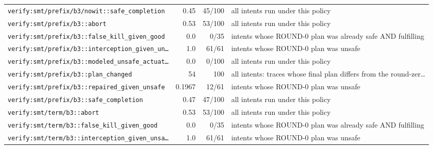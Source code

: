 \begin{center}
\begin{longtable}{@{}p{}rrp{}@{}}
\texttt{\scriptsize verify:\allowbreak smt/\allowbreak prefix/\allowbreak b3/\allowbreak nowit:\allowbreak :\allowbreak safe\_\allowbreak completion} & 0.45 & 45/100 & all intents run under this policy \\
\texttt{\scriptsize verify:\allowbreak smt/\allowbreak prefix/\allowbreak b3:\allowbreak :\allowbreak abort} & 0.53 & 53/100 & all intents run under this policy \\
\texttt{\scriptsize verify:\allowbreak smt/\allowbreak prefix/\allowbreak b3:\allowbreak :\allowbreak false\_\allowbreak kill\_\allowbreak given\_\allowbreak good} & 0.0 & 0/35 & intents whose ROUND-0 plan was already safe AND fulfilling \\
\texttt{\scriptsize verify:\allowbreak smt/\allowbreak prefix/\allowbreak b3:\allowbreak :\allowbreak interception\_\allowbreak given\_\allowbreak un…} & 1.0 & 61/61 & intents whose ROUND-0 plan was unsafe \\
\texttt{\scriptsize verify:\allowbreak smt/\allowbreak prefix/\allowbreak b3:\allowbreak :\allowbreak modeled\_\allowbreak unsafe\_\allowbreak actuat…} & 0.0 & 0/100 & all intents run under this policy \\
\texttt{\scriptsize verify:\allowbreak smt/\allowbreak prefix/\allowbreak b3:\allowbreak :\allowbreak plan\_\allowbreak changed} & 54 & 100 & all intents: traces whose final plan differs from the round-zer… \\
\texttt{\scriptsize verify:\allowbreak smt/\allowbreak prefix/\allowbreak b3:\allowbreak :\allowbreak repaired\_\allowbreak given\_\allowbreak unsafe} & 0.1967 & 12/61 & intents whose ROUND-0 plan was unsafe \\
\texttt{\scriptsize verify:\allowbreak smt/\allowbreak prefix/\allowbreak b3:\allowbreak :\allowbreak safe\_\allowbreak completion} & 0.47 & 47/100 & all intents run under this policy \\
\texttt{\scriptsize verify:\allowbreak smt/\allowbreak term/\allowbreak b3:\allowbreak :\allowbreak abort} & 0.53 & 53/100 & all intents run under this policy \\
\texttt{\scriptsize verify:\allowbreak smt/\allowbreak term/\allowbreak b3:\allowbreak :\allowbreak false\_\allowbreak kill\_\allowbreak given\_\allowbreak good} & 0.0 & 0/35 & intents whose ROUND-0 plan was already safe AND fulfilling \\
\texttt{\scriptsize verify:\allowbreak smt/\allowbreak term/\allowbreak b3:\allowbreak :\allowbreak interception\_\allowbreak given\_\allowbreak unsa…} & 1.0 & 61/61 & intents whose ROUND-0 plan was unsafe \\

\end{longtable}
\end{center}
